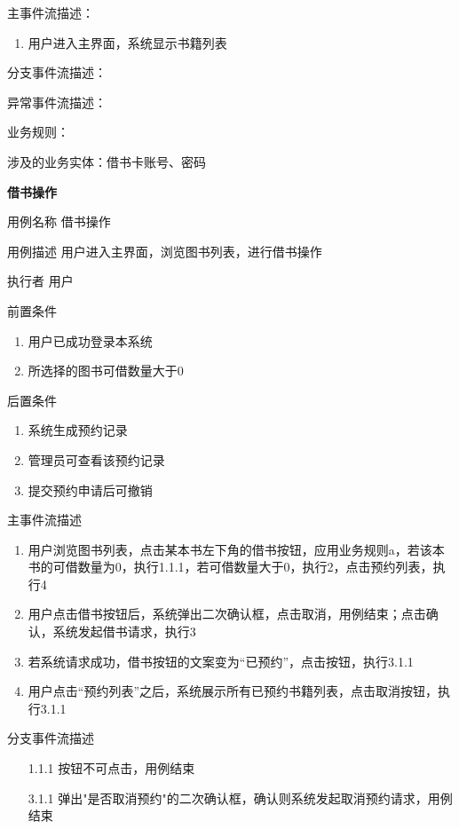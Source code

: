     主事件流描述：
        \begin{enumerate} 
            \item 用户进入主界面，系统显示书籍列表
        \end{enumerate}

    分支事件流描述： ~ 

    异常事件流描述：~ 

    业务规则： ~ 

    涉及的业务实体：借书卡账号、密码

    
\textbf{借书操作}

    用例名称     借书操作

    用例描述     用户进入主界面，浏览图书列表，进行借书操作

    执行者      用户

    前置条件     \begin{enumerate}
        \item 用户已成功登录本系统
        \item 所选择的图书可借数量大于0
    \end{enumerate}

    后置条件     \begin{enumerate}
        \item 系统生成预约记录
        \item 管理员可查看该预约记录
        \item 提交预约申请后可撤销
    \end{enumerate}

    主事件流描述   \begin{enumerate} 
            \item 用户浏览图书列表，点击某本书左下角的借书按钮，应用业务规则a，若该本书的可借数量为0，执行1.1.1，若可借数量大于0，执行2，点击预约列表，执行4
            \item 用户点击借书按钮后，系统弹出二次确认框，点击取消，用例结束；点击确认，系统发起借书请求，执行3
            \item 若系统请求成功，借书按钮的文案变为“已预约”，点击按钮，执行3.1.1
            \item 用户点击“预约列表”之后，系统展示所有已预约书籍列表，点击取消按钮，执行3.1.1
        \end{enumerate}

    分支事件流描述  \begin{itemize}
        \item[1.1.1]  按钮不可点击，用例结束
        \item[3.1.1] 弹出"是否取消预约"的二次确认框，确认则系统发起取消预约请求，用例结束      
    \end{itemize}

